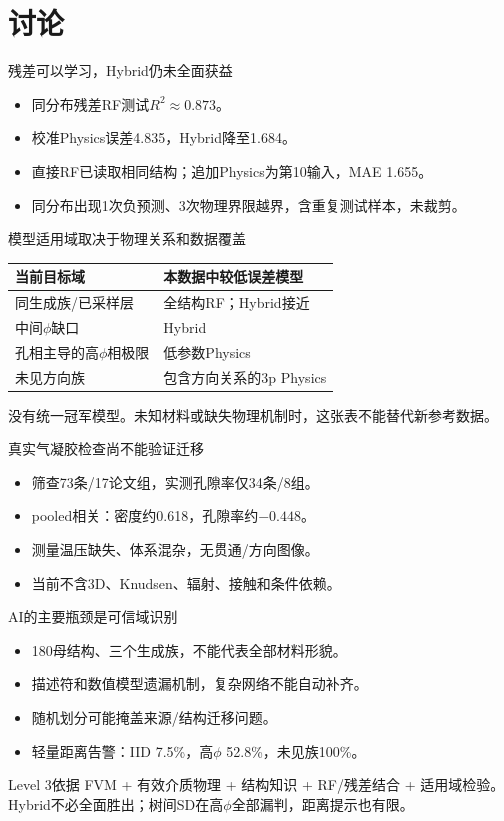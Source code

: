 \documentclass[10pt,aspectratio=169]{beamer}
\newcommand{\source}[1]{\par\vspace{1mm}{\scriptsize #1}}
\begin{document}
\section{讨论}
\begin{frame}{残差可以学习，Hybrid仍未全面获益}
\begin{itemize}
\item 同分布残差RF测试$R^2\approx0.873$。
\item 校准Physics误差4.835，Hybrid降至1.684。
\item 直接RF已读取相同结构；追加Physics为第10输入，MAE 1.655。
\item 同分布出现1次负预测、3次物理界限越界，含重复测试样本，未裁剪。
\end{itemize}
\source{物理主干是归纳偏置，不自动增加几何信息，也不自动约束总输出。}
\end{frame}
\begin{frame}{模型适用域取决于物理关系和数据覆盖}
\begin{tabular}{ll}\toprule
当前目标域&本数据中较低误差模型\\\midrule
同生成族/已采样层&全结构RF；Hybrid接近\\
中间$\phi$缺口&Hybrid\\
孔相主导的高$\phi$相极限&低参数Physics\\
未见方向族&包含方向关系的3p Physics\\\bottomrule
\end{tabular}
\par\vspace{4mm}
没有统一冠军模型。未知材料或缺失物理机制时，这张表不能替代新参考数据。
\end{frame}
\begin{frame}{真实气凝胶检查尚不能验证迁移}
\begin{itemize}
\item 筛查73条/17论文组，实测孔隙率仅34条/8组\cite{walker2023}。
\item pooled相关：密度约0.618，孔隙率约$-0.448$。
\item 测量温压缺失、体系混杂，无贯通/方向图像。
\item 当前不含3D、Knudsen、辐射、接触和条件依赖。
\end{itemize}
\source{这是有限趋势与现实距离，不是严格外部验证；没有重新训练实验模型。}
\end{frame}
\begin{frame}{AI的主要瓶颈是可信域识别}
\begin{itemize}
\item 180母结构、三个生成族，不能代表全部材料形貌。
\item 描述符和数值模型遗漏机制，复杂网络不能自动补齐。
\item 随机划分可能掩盖来源/结构迁移问题。
\item 轻量距离告警：IID 7.5\%，高$\phi$ 52.8\%，未见族100\%。
\end{itemize}
\begin{block}{Level 3依据}
FVM + 有效介质物理 + 结构知识 + RF/残差结合 + 适用域检验。\\
Hybrid不必全面胜出；树间SD在高$\phi$全部漏判，距离提示也有限。
\end{block}
\end{frame}
\end{document}
